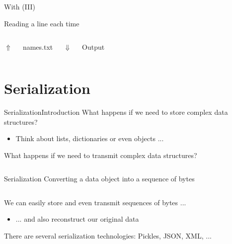 \documentclass[10pt,compress]{beamer} %
\begin{document}
\begin{frame}[fragile]{With (III)}
	\begin{exampleblock}{Reading a line each time}
	\vspace{-0.2cm}
	
	\vspace{-0.2cm}
	\end{exampleblock}

	\begin{columns}
    \centering $\Uparrow$
	\begin{exampleblock}{names.txt}
	
	\end{exampleblock}
    \centering $\Downarrow$
	\begin{exampleblock}{Output}
	
	\end{exampleblock}
	\end{columns}
	
\end{frame}

\section{Serialization}

\begin{frame}[fragile]{Serialization}{Introduction}
    What happens if we need to store complex data structures?
		\begin{itemize}
			\item Think about lists, dictionaries or even objects ...
		\end{itemize}
    What happens if we need to transmit complex data structures?

	\begin{columns}
	\column{.6\textwidth}
	\begin{block}{Serialization}
    Converting a data object into a sequence of bytes
	\end{block}
    \end{columns}

    \bigskip

    We can easily store and even transmit sequences of bytes ...
	\begin{itemize}
        \item ... and also reconstruct our original data
	\end{itemize}
	There are several serialization technologies: Pickles, JSON, XML, ...

\end{frame}
\end{document}
